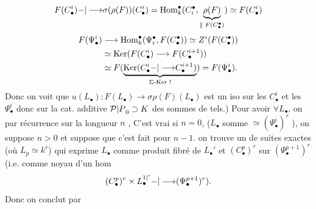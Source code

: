 \[
F(C_\bullet^i){-|\longrightarrow}\sigma(\rho(F))(C_\bullet^i)
=\operatorname{Hom}_k^\bullet(C_i^\bullet,\underbrace{\rho(F)}_{\Vert\;F(C_\bullet^\bullet)})
\simeq F(C_\bullet^i)
\]
\[
\begin{aligned}
F(\Psi_\bullet^i)&\longrightarrow\operatorname{Hom}_k^\bullet(\Psi_i^\bullet,F(C_\bullet^\bullet))
\simeq Z^i(F(C_\bullet^\bullet))\\
&\simeq\operatorname{Ker}(F(C_\bullet^i)\longrightarrow F(C_\bullet^{i+1}))\\
&\simeq F(\underbrace{\operatorname{Ker}(C_\bullet^i{-|\longrightarrow}C_\bullet^{i+1})}_{\Sigma\text{-Ker !}})
=F(\Psi_\bullet^i).
\end{aligned}
\]
Donc on voit que $u(L_\bullet):F(L_\bullet)\longrightarrow\sigma\rho(F)(L_\bullet)$
est un iso sur les $C_\bullet^i$ et les $\Psi_\bullet^i$ donc
sur  la cat. additive ${\mathcal P|P}_0\supset K$ des sommes
de tels.) Pour avoir $\forall L_\bullet$, on 
par récurrence sur la longueur $n$ ,
C'est vrai si $n=0$, ($L_\bullet$ somme $\simeq(\Psi_\bullet^i)^r$
), on
suppose $n>0$ et suppose que c'est fait pour
$n-1$.
on trouve un  de suites exactes (où $L_p\simeq k^r$)
qui exprime $L_\bullet$ comme produit fibré
de $L_\bullet'$ et $(C_\bullet^p)^r$ sur $(\Psi_\bullet^{p+1})^r$ (i.e. comme
noyau d'un hom 
\[
(C_\bullet^p)^r\times L_\bullet^{{1|'}}{-|\longrightarrow}(\Psi_\bullet^{p+1})^r).
\]
Donc on conclut par

